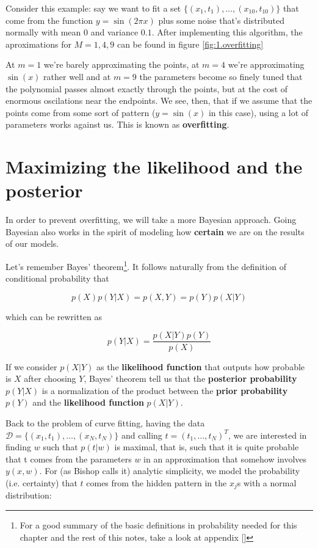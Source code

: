Consider this example: say we want to fit a set $\{(x_1, t_1),\dots,(x_{10},t_{10})\}$ that come from the function $y=\sin(2\pi x)$ plus some noise that's distributed normally with mean $0$ and variance $0.1$. After implementing this algorithm, the aproximations for $M = 1, 4, 9$ can be found in figure \ref{fig:1.overfitting}

At $m=1$ we're barely approximating the points, at $m=4$ we're approximating $\sin(x)$ rather well and at $m=9$ the parameters become so finely tuned that the polynomial passes almost exactly through the points, but at the cost of enormous oscilations near the endpoints. We see, then, that if we assume that the points come from some sort of pattern ($y = \sin(x)$ in this case), using a lot of parameters works against us. This is known as \textbf{overfitting}.

\section{Maximizing the likelihood and the posterior}

In order to prevent overfitting, we will take a more Bayesian approach. Going Bayesian also works in the spirit of modeling how \textbf{certain} we are on the results of our models.

Let's remember Bayes' theorem\footnote{For a good summary of the basic definitions in probability needed for this chapter and the rest of this notes, take a look at appendix []}. It follows naturally from the definition of conditional probability that

\[p(X)p(Y|X) = p(X,Y) = p(Y)p(X|Y)\]

which can be rewritten as

\[p(Y|X) = \frac{p(X|Y)p(Y)}{p(X)}\]

If we consider $p(X|Y)$ as the \textbf{likelihood function} that outputs how probable is $X$ after choosing $Y$, Bayes' theorem tell us that the \textbf{posterior probability} $p(Y|X)$ is a normalization of the product between the \textbf{prior probability} $p(Y)$ and the \textbf{likelihood function} $p(X|Y)$.

Back to the problem of curve fitting, having the data $\mathcal{D} = \{(x_1, t_1),\dots,(x_N, t_N)\}$ and calling $t = (t_1,\dots, t_N)^T$, we are interested in finding $w$ such that $p(t|w)$ is maximal, that is, such that it is quite probable that t comes from the parameters $w$ in an approximation that somehow involves $y(x,w)$. For (as Bishop calls it) analytic simplicity, we model the probability (i.e. certainty) that $t$ comes from the hidden pattern in the $x_j$s with a normal distribution:

